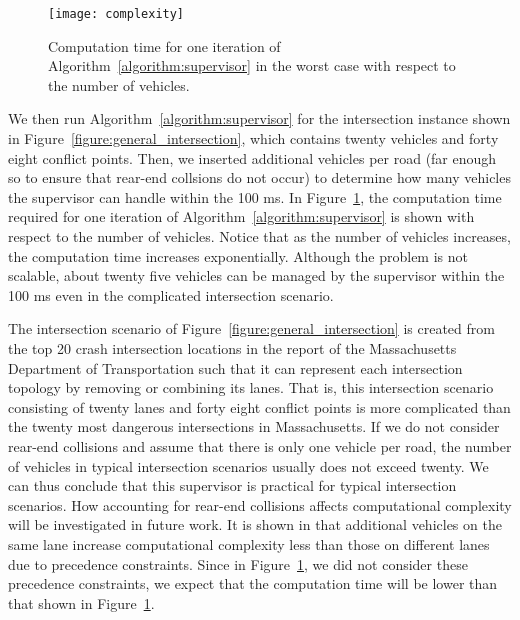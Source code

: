 \documentclass{sig-alternate}
\begin{document}
\begin{figure}[htb!]
	\texttt{[image: complexity]}
	\caption{Computation time for one iteration of  Algorithm~\ref{algorithm:supervisor} in the worst case with respect to the number of vehicles. }
	\label{figure:complexity}
\end{figure}
We then run Algorithm~\ref{algorithm:supervisor} for the intersection instance shown in Figure~\ref{figure:general_intersection}, which contains twenty vehicles and forty eight conflict points. Then, we inserted additional vehicles per road (far enough so to ensure that rear-end collsions do not occur) to determine how many vehicles the supervisor can handle within the 100 ms. In Figure~\ref{figure:complexity}, the computation time required for one iteration of Algorithm~\ref{algorithm:supervisor} is shown with respect to the number of vehicles. Notice that as the number of vehicles increases, the computation time increases exponentially. Although the problem is not scalable, about twenty five vehicles can be managed by the supervisor within the 100 ms even in the complicated intersection scenario. 

The intersection scenario of Figure~\ref{figure:general_intersection} is created from the top 20 crash intersection locations in the report of the Massachusetts Department of Transportation \cite{MassDOT_2012_Topcrash} such that it can represent each intersection topology by removing or combining its lanes. That is, this intersection scenario consisting of twenty lanes and forty eight conflict points is more complicated than the twenty most dangerous intersections in Massachusetts. If we do not consider rear-end collisions and assume that there is only one vehicle per road, the number of vehicles in typical intersection scenarios usually does not exceed twenty. We can thus conclude that this supervisor is practical for typical intersection scenarios. How accounting for rear-end collisions affects computational complexity will be investigated in future work. It is shown in \cite{colombo_least_2014} that additional vehicles on the same lane increase computational complexity less than those on different lanes due to precedence constraints. Since in Figure~\ref{figure:complexity}, we did not consider these precedence constraints, we expect that the computation time will be lower than that shown in Figure~\ref{figure:complexity}.
\end{document}
